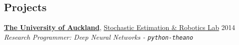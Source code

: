 \documentclass[margin, line]{res}
\newcommand{\AucklandUni}{https://www.cs.auckland.ac.nz/en.html}
\newcommand{\AucklandResearch}{http://homepages.engineering.auckland.ac.nz/~smohan/Research.html}
\newcommand{\BFGS}{http://en.wikipedia.org/wiki/Broyden-Fletcher-Goldfarb-Shanno_algorithm}
\newcommand{\GARCH}{https://www.quantnet.com/threads/student-t-innovation-problems-garch-1-1.15612/\#post-125141}
\newcommand{\Jim}{http://www.jimal-khalili.com/teaching}
\newcommand{\robotwealth}{https://robotwealth.com/fundamentals-of-algorithmic-trading-curriculum/}
\newenvironment{list2}{
	\begin{list}{$\bullet$}{%
		\setlength{\itemsep}{0in}
		\setlength{\parsep}{0in} \setlength{\parskip}{0in}
		\setlength{\topsep}{0in} \setlength{\partopsep}{0in}
		\setlength{\leftmargin}{0.2in}}}{\end{list}}
\begin{document}
\begin{resume}
\vspace{0.15in}
\section{\sc Projects}

{\bf \href{\AucklandUni}{The University of Auckland}}, \href{\AucklandResearch}{Stochastic Estimation \& Robotics Lab} \hfill {2014}
\\
\vspace{-.3cm}
{\em Research Programmer: Deep Neural Networks - \verb|python-theano|}


\end{resume}
\end{document}
